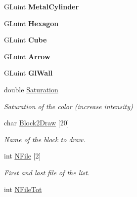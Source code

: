 \begin{DoxyCompactItemize}
\item 
\hypertarget{classElPoly_ab55c93c4e818081ea7b8d1e2d41851f4}{\-G\-Luint {\bfseries \-Metal\-Cylinder}}\label{classElPoly_ab55c93c4e818081ea7b8d1e2d41851f4}

\item 
\hypertarget{classElPoly_ab3a3a889149c8b1ff7e39ca3c032f16c}{\-G\-Luint {\bfseries \-Hexagon}}\label{classElPoly_ab3a3a889149c8b1ff7e39ca3c032f16c}

\item 
\hypertarget{classElPoly_a79fa212e7dfcc2876d337a3635ecdc6f}{\-G\-Luint {\bfseries \-Cube}}\label{classElPoly_a79fa212e7dfcc2876d337a3635ecdc6f}

\item 
\hypertarget{classElPoly_ae374e4cd54f633606db3098af179b138}{\-G\-Luint {\bfseries \-Arrow}}\label{classElPoly_ae374e4cd54f633606db3098af179b138}

\item 
\hypertarget{classElPoly_ab6e9ec77599bfe76cdbe67e70d1b2ce8}{\-G\-Luint {\bfseries \-Gl\-Wall}}\label{classElPoly_ab6e9ec77599bfe76cdbe67e70d1b2ce8}

\item 
\hypertarget{classElPoly_a8f3e2abcdf9991d97b9fb04b77c1f308}{double \hyperlink{classElPoly_a8f3e2abcdf9991d97b9fb04b77c1f308}{\-Saturation}}\label{classElPoly_a8f3e2abcdf9991d97b9fb04b77c1f308}

\begin{DoxyCompactList}\small\item\em \-Saturation of the color (increase intensity) \end{DoxyCompactList}\item 
\hypertarget{classElPoly_a3ea47501772e8717e5d6fb04cc1999b2}{char \hyperlink{classElPoly_a3ea47501772e8717e5d6fb04cc1999b2}{\-Block2\-Draw} \mbox{[}20\mbox{]}}\label{classElPoly_a3ea47501772e8717e5d6fb04cc1999b2}

\begin{DoxyCompactList}\small\item\em \-Name of the block to draw. \end{DoxyCompactList}\item 
\hypertarget{classElPoly_afc36f5ebb0ee5c1be5fc2161e1fa3959}{int \hyperlink{classElPoly_afc36f5ebb0ee5c1be5fc2161e1fa3959}{\-N\-File} \mbox{[}2\mbox{]}}\label{classElPoly_afc36f5ebb0ee5c1be5fc2161e1fa3959}

\begin{DoxyCompactList}\small\item\em \-First and last file of the list. \end{DoxyCompactList}\item 
\hypertarget{classElPoly_ad7dff49d260c06459abb507a09fa932d}{int \hyperlink{classElPoly_ad7dff49d260c06459abb507a09fa932d}{\-N\-File\-Tot}}\label{classElPoly_ad7dff49d260c06459abb507a09fa932d}


\end{DoxyCompactItemize}
